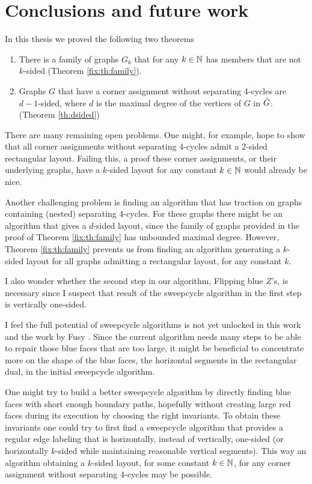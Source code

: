
\thispagestyle{plain}
\section{Conclusions and future work}

In this thesis we proved the following two theorems

\begin{enumerate}
  \item There is a family of graphs $G_k$ that for any $k \in \mathbb{N}$ has members that are not $k$-sided (Theorem \ref{fix:th:family}).
  \item Graphs $G$ that have a corner assignment without separating 4-cycles are $d-1$-sided, where $d$ is the maximal degree of the vertices of $G$ in $\bar{G}$. (Theorem \ref{th:dsided})
\end{enumerate}

There are many remaining open problems.
One might, for example, hope to show that all corner assignments without separating $4$-cycles admit a $2$-sided rectangular layout. Failing this, a proof these corner assignments, or their underlying graphs, have a $k$-sided layout for any constant $k\in \mathbb{N}$ would already be nice.

Another challenging problem is finding an algorithm that has traction on graphs containing (nested) separating 4-cycles.
For these graphs there might be an algorithm that gives a $d$-sided layout, since the family of graphs provided in the proof of Theorem \ref{fix:th:family} has unbounded maximal degree.
However, Theorem \ref{fix:th:family} prevents us from finding an algorithm generating a $k$-sided layout for all graphs admitting a rectangular layout, for any constant $k$.

I also wonder whether the second step in our algorithm, Flipping blue $Z$'s, is necessary since I suspect that result of the sweepcycle algorithm in the first step is vertically one-sided.

I feel the full potential of sweepcycle algorithms is not yet unlocked in this work and the work by Fusy \cite{Fusy2006}.
Since the current algorithm needs many steps to be able to repair those blue faces that are too large, it might be beneficial to concentrate more on the shape of the blue faces, the horizontal segments in the rectangular dual, in the initial sweepcycle algorithm.

One might try to build a better sweepcycle algorithm by directly finding blue faces with short enough boundary paths, hopefully without creating large red faces during its execution by choosing the right invariants.
To obtain these invariants one could try to first find a sweepcycle algorithm that provides a regular edge labeling that is horizontally, instead of vertically, one-sided (or horizontally $k$-sided while maintaining reasonable vertical segments).
This way an algorithm obtaining a $k$-sided layout, for some constant $k \in \mathbb{N}$, for any corner assignment without separating $4$-cycles may be possible.

